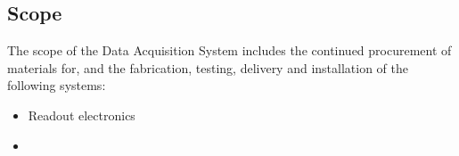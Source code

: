 

\subsection{Scope}
\label{sec:fdsp-daq-scope}


The scope of the Data Acquisition System includes the continued procurement of materials for, and the fabrication, testing, delivery and installation of the following systems: 


\begin{itemize}
\item Readout electronics 
\item 
\end{itemize}


\newpage 
